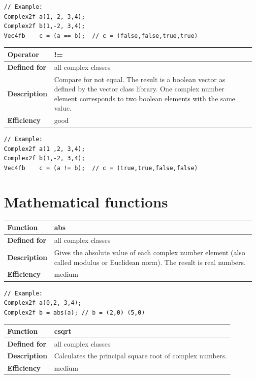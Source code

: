 \documentclass[11pt,a4paper,oneside,openright]{report}
\newcommand{\vspacesmall}{\vspace{3mm}}
\newcommand{\vspacebig}{\vspace{6mm}}
\begin{document}
\begin{lstlisting}[frame=none]
// Example:
Complex2f a(1, 2, 3,4);
Complex2f b(1,-2, 3,4);
Vec4fb    c = (a == b);  // c = (false,false,true,true)
\end{lstlisting}
\vspacebig


\begin{tabular}{|p{25mm}|p{100mm}|}
\hline
\bfseries Operator & != \\ \hline
\bfseries Defined for & all complex classes  \\ \hline
\bfseries Description & Compare for not equal.\newline
The result is a boolean vector as defined by the vector class library.\newline
One complex number element corresponds to two boolean elements with the same value. \\ \hline
\bfseries Efficiency & good \\ \hline
\end{tabular}
\vspacesmall

\begin{lstlisting}[frame=none]
// Example:
Complex2f a(1 ,2, 3,4);
Complex2f b(1,-2, 3,4);
Vec4fb    c = (a != b);  // c = (true,true,false,false)
\end{lstlisting}
\vspacebig


\chapter{Mathematical functions}\label{chap:MathematicalFunctions}


\begin{tabular}{|p{25mm}|p{100mm}|}
\hline
\bfseries Function & abs \\ \hline
\bfseries Defined for & all complex classes  \\ \hline
\bfseries Description & Gives the absolute value of each complex number element (also called modulus or Euclidean norm). \newline
The result is real numbers. \\ \hline
\bfseries Efficiency & medium \\ \hline
\end{tabular}
\vspacesmall

\begin{lstlisting}[frame=none]
// Example:
Complex2f a(0,2, 3,4);
Complex2f b = abs(a); // b = (2,0) (5,0)
\end{lstlisting}
\vspacebig


\begin{tabular}{|p{25mm}|p{100mm}|}
\hline
\bfseries Function & csqrt \\ \hline
\bfseries Defined for & all complex classes  \\ \hline
\bfseries Description & Calculates the principal square root of complex numbers. \\ \hline
\bfseries Efficiency & medium \\ \hline
\end{tabular}
\vspacesmall
\end{document}
